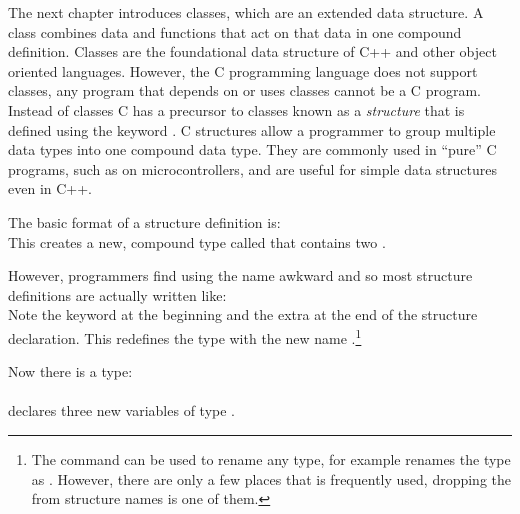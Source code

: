

The next chapter introduces classes, which are an extended data structure.  A class combines data and functions that act on that data in one compound definition.  Classes are the foundational data structure of C++ and other object oriented languages.
However, the C programming language does not support classes, any program that depends on or uses classes cannot be a C program.  
Instead of classes C has a precursor to classes known as a \emph{structure} that is defined using the keyword .  C structures allow a programmer to group multiple data types into one compound data type.  They are commonly used in ``pure'' C programs, such as on microcontrollers, and are useful for simple data structures even in C++.

The basic format of a structure definition is:\\
This creates a new, compound type called  that contains two .

However, programmers find using the name  awkward and so most structure definitions are actually written like:\\
Note the keyword  at the beginning and the extra  at the end of the structure declaration.  This redefines the type  with the new name .\footnote{The  command can be used to rename any type, for example  renames the type  as .  However, there are only a few places that  is frequently used, dropping the  from structure names is one of them.}

Now there is a  type:\\
\\
declares three new variables of type .

